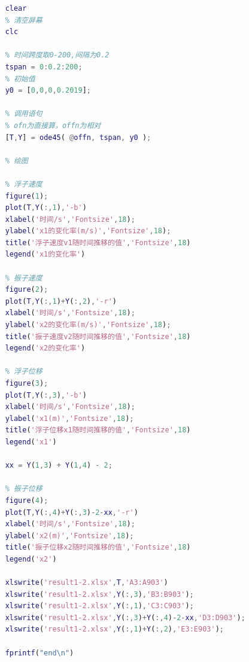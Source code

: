 \documentclass[12pt,utf8]{article}
\begin{document}
\begin{lstlisting}[language=matlab,caption={求解问题1-2的MatLab代码}]
	% 清空所有变量
	clear
	% 清空屏幕
	clc
	
	% 时间跨度取0-200,间隔为0.2
	tspan = 0:0.2:200;
	% 初始值
	y0 = [0,0,0,0.2019];
	
	% 调用语句
	% ofn为直接算，offn为相对
	[T,Y] = ode45( @offn, tspan, y0 );
	
	% 绘图
	
	% 浮子速度
	figure(1);
	plot(T,Y(:,1),'-b')
	xlabel('时间/s','Fontsize',18);
	ylabel('x1的变化率(m/s)','Fontsize',18);
	title('浮子速度v1随时间推移的值','Fontsize',18)
	legend('x1的变化率')
	
	% 振子速度
	figure(2);
	plot(T,Y(:,1)+Y(:,2),'-r')
	xlabel('时间/s','Fontsize',18);
	ylabel('x2的变化率(m/s)','Fontsize',18);
	title('振子速度v2随时间推移的值','Fontsize',18)
	legend('x2的变化率')
	
	% 浮子位移
	figure(3);
	plot(T,Y(:,3),'-b')
	xlabel('时间/s','Fontsize',18);
	ylabel('x1(m)','Fontsize',18);
	title('浮子位移x1随时间推移的值','Fontsize',18)
	legend('x1')
	
	xx = Y(1,3) + Y(1,4) - 2;
	
	% 振子位移
	figure(4);
	plot(T,Y(:,4)+Y(:,3)-2-xx,'-r')
	xlabel('时间/s','Fontsize',18);
	ylabel('x2(m)','Fontsize',18);
	title('振子位移x2随时间推移的值','Fontsize',18)
	legend('x2')
	
	xlswrite('result1-2.xlsx',T,'A3:A903')
	xlswrite('result1-2.xlsx',Y(:,3),'B3:B903');
	xlswrite('result1-2.xlsx',Y(:,1),'C3:C903');
	xlswrite('result1-2.xlsx',Y(:,3)+Y(:,4)-2-xx,'D3:D903');
	xlswrite('result1-2.xlsx',Y(:,1)+Y(:,2),'E3:E903');
	
	fprintf("end\n")
 \end{lstlisting}
\end{document}
